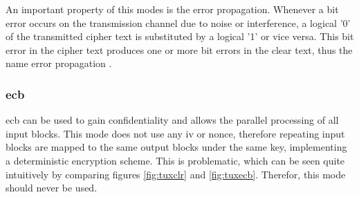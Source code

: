 An important property of this modes is the error propagation.
Whenever a bit error occurs on the transmission channel due to noise or interference,
a logical '0' of the transmitted cipher text is substituted by a logical '1' or vice versa. This bit error in the cipher text produces one or more bit errors
in the clear text, thus the name error propagation \cite{burda}.

\subsubsection{\gls{ecb}}\label{deterministicEnc}

\gls{ecb} can be used to gain confidentiality and allows the parallel processing of all input blocks. This mode does not use any \gls{iv} or nonce, therefore
repeating input blocks are mapped to the same output blocks under the same key, implementing a deterministic encryption scheme.
This is problematic, which can be seen quite intuitively by comparing 
figures \ref{fig:tuxclr} and \ref{fig:tuxecb}. Therefor, this mode should never be used.

